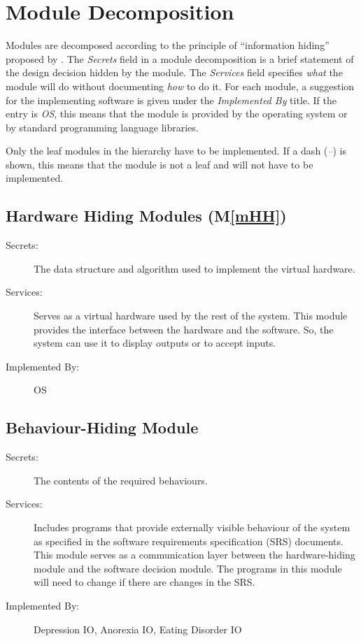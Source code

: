 \documentclass[12pt, titlepage]{article}
\newcommand{\mref}[1]{M\ref{#1}}
\begin{document}
\section{Module Decomposition} \label{SecMD}

Modules are decomposed according to the principle of ``information hiding''
proposed by \citet{ParnasEtAl1984}. The \emph{Secrets} field in a module
decomposition is a brief statement of the design decision hidden by the
module. The \emph{Services} field specifies \emph{what} the module will do
without documenting \emph{how} to do it. For each module, a suggestion for the
implementing software is given under the \emph{Implemented By} title. If the
entry is \emph{OS}, this means that the module is provided by the operating
system or by standard programming language libraries.

Only the leaf modules in the hierarchy have to be implemented. If a dash
(\emph{--}) is shown, this means that the module is not a leaf and will not have
to be implemented.

\subsection{Hardware Hiding Modules (\mref{mHH})}

\begin{description}
\item[Secrets:]The data structure and algorithm used to implement the virtual
  hardware.
\item[Services:]Serves as a virtual hardware used by the rest of the
  system. This module provides the interface between the hardware and the
  software. So, the system can use it to display outputs or to accept inputs.
\item[Implemented By:] OS
\end{description}

\subsection{Behaviour-Hiding Module}

\begin{description}
\item[Secrets:]The contents of the required behaviours.
\item[Services:]Includes programs that provide externally visible behaviour of
  the system as specified in the software requirements specification (SRS)
  documents. This module serves as a communication layer between the
  hardware-hiding module and the software decision module. The programs in this
  module will need to change if there are changes in the SRS.
\item[Implemented By:] Depression IO, Anorexia IO, Eating Disorder IO
\end{description}
\end{document}
